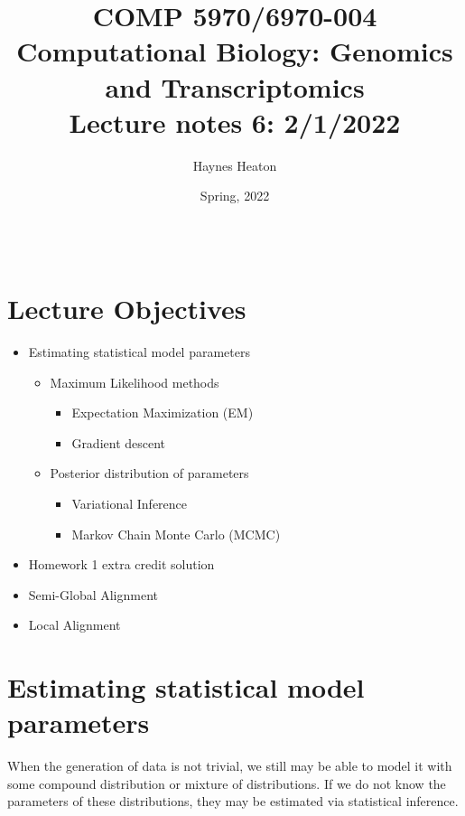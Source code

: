 \documentclass[11pt]{article}
\title{COMP 5970/6970-004 \\ Computational Biology: Genomics and Transcriptomics \\ Lecture notes 6: 2/1/2022 }
\author{Haynes Heaton}
\date{Spring, 2022}
\newcommand{\blankline}{\quad\pagebreak[2]}
\begin{document}
\maketitle

\blankline

\begin{tabular*}{.93\textwidth}{@{\extracolsep{\fill}}lr}



\hline
\end{tabular*}

\vspace{5 mm}


\section*{Lecture Objectives}
\begin{itemize}
\item Estimating statistical model parameters
\begin{itemize}
\item Maximum Likelihood methods
\begin{itemize}
\item Expectation Maximization (EM)
\item Gradient descent
\end{itemize}
\item Posterior distribution of parameters
\begin{itemize}
\item Variational Inference 
\item Markov Chain Monte Carlo (MCMC)
\end{itemize}
\end{itemize}
\item Homework 1 extra credit solution
\item Semi-Global Alignment
\item Local Alignment
\end{itemize}

\section*{Estimating statistical model parameters}
When the generation of data is not trivial, we still may be able to model it with some compound distribution or mixture of distributions. If we do not know the parameters of these distributions, they may be estimated via statistical inference. 
\end{document}
